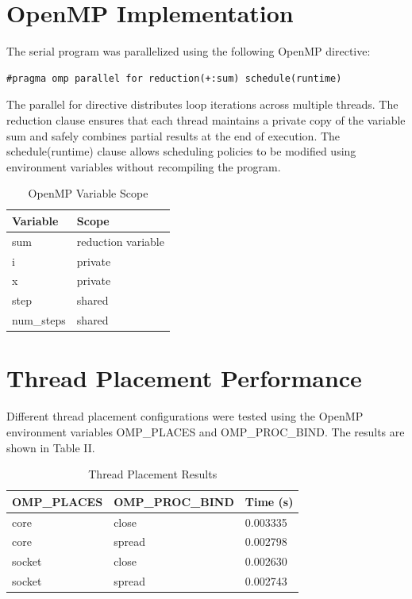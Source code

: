 \documentclass[conference]{IEEEtran}
\begin{document}
\section{OpenMP Implementation}

The serial program was parallelized using the following OpenMP directive:

\begin{verbatim}
#pragma omp parallel for reduction(+:sum) schedule(runtime)
\end{verbatim}

The parallel for directive distributes loop iterations across multiple threads. The reduction clause ensures that each thread maintains a private copy of the variable sum and safely combines partial results at the end of execution. The schedule(runtime) clause allows scheduling policies to be modified using environment variables without recompiling the program.

\begin{table}[htbp]
\caption{OpenMP Variable Scope}
\centering
\begin{tabular}{ll}
\toprule
Variable & Scope \\
\midrule
sum & reduction variable \\
i & private \\
x & private \\
step & shared \\
num\_steps & shared \\
\bottomrule
\end{tabular}
\end{table}

\section{Thread Placement Performance}

Different thread placement configurations were tested using the OpenMP environment variables OMP\_PLACES and OMP\_PROC\_BIND. The results are shown in Table II.

\begin{table}[htbp]
\caption{Thread Placement Results}
\centering
\begin{tabular}{lll}
\toprule
OMP\_PLACES & OMP\_PROC\_BIND & Time (s) \\
\midrule
core & close & 0.003335 \\
core & spread & 0.002798 \\
socket & close & 0.002630 \\
socket & spread & 0.002743 \\
\bottomrule
\end{tabular}
\end{table}
\end{document}
